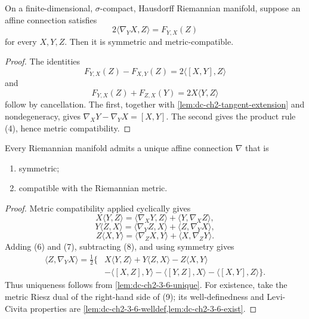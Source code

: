 \begin{lemma}
  \label{lem:dc-ch2-3-6-exist}
  \leanok
  On a finite-dimensional, $\sigma$-compact, Hausdorff Riemannian manifold,
  suppose an affine connection satisfies
  \[
    2\langle\nabla_YX,Z\rangle=F_{Y,X}(Z)
  \]
  for every $X,Y,Z$. Then it is symmetric and metric-compatible.
\end{lemma}
\begin{proof}
  \leanok
  \sketch
  The identities
  \[
    F_{Y,X}(Z)-F_{X,Y}(Z)=2\langle[X,Y],Z\rangle
  \]
  and
  \[
    F_{Y,X}(Z)+F_{Z,X}(Y)=2X\langle Y,Z\rangle
  \]
  follow by cancellation. The first, together with
  \cref{lem:dc-ch2-tangent-extension} and nondegeneracy, gives
  $\nabla_XY-\nabla_YX=[X,Y]$. The second gives the product rule (4), hence
  metric compatibility.
\end{proof}

\begin{theorem}
  \label{thm:dc-ch2-3-6}
  \leanok
  Every Riemannian manifold admits a unique affine connection $\nabla$ that is
  \begin{enumerate}
    \item[(a)] symmetric;
    \item[(b)] compatible with the Riemannian metric.
  \end{enumerate}
\end{theorem}
\begin{proof}
  \leanok
  \sketch
  Metric compatibility applied cyclically gives
  \[
    X\langle Y,Z\rangle
      =\langle\nabla_XY,Z\rangle+\langle Y,\nabla_XZ\rangle,\tag{6}
  \]
  \[
    Y\langle Z,X\rangle
      =\langle\nabla_YZ,X\rangle+\langle Z,\nabla_YX\rangle,\tag{7}
  \]
  \[
    Z\langle X,Y\rangle
      =\langle\nabla_ZX,Y\rangle+\langle X,\nabla_ZY\rangle.\tag{8}
  \]
  Adding (6) and (7), subtracting (8), and using symmetry gives
  \[
    \begin{aligned}
    \langle Z,\nabla_YX\rangle=\tfrac12\{&X\langle Y,Z\rangle
      +Y\langle Z,X\rangle-Z\langle X,Y\rangle\\
      &-\langle[X,Z],Y\rangle-\langle[Y,Z],X\rangle
       -\langle[X,Y],Z\rangle\}.\tag{9}
    \end{aligned}
  \]
  Thus uniqueness follows from \cref{lem:dc-ch2-3-6-unique}. For existence,
  take the metric Riesz dual of the right-hand side of (9); its
  well-definedness and Levi-Civita properties are
  \cref{lem:dc-ch2-3-6-welldef,lem:dc-ch2-3-6-exist}.
\end{proof}


